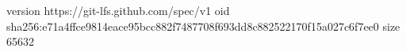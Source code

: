 version https://git-lfs.github.com/spec/v1
oid sha256:e71a4ffce9814eace95bcc882f7487708f693dd8c882522170f15a027c6f7ee0
size 65632
